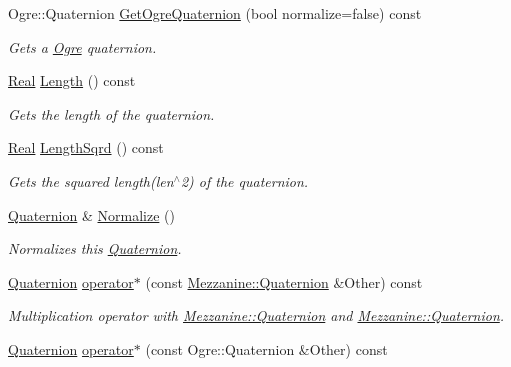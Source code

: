 \begin{DoxyCompactItemize}
Ogre::Quaternion \hyperlink{classMezzanine_1_1Quaternion_a152abb6ccfe1c9dfb22218fd54b84863}{GetOgreQuaternion} (bool normalize=false) const 
\begin{DoxyCompactList}\small\item\em Gets a \hyperlink{namespaceOgre}{Ogre} quaternion. \item\end{DoxyCompactList}\item 
\hyperlink{namespaceMezzanine_a726731b1a7df72bf3583e4a97282c6f6}{Real} \hyperlink{classMezzanine_1_1Quaternion_adb15aea643ea4b9ca1042209ac424fda}{Length} () const 
\begin{DoxyCompactList}\small\item\em Gets the length of the quaternion. \item\end{DoxyCompactList}\item 
\hyperlink{namespaceMezzanine_a726731b1a7df72bf3583e4a97282c6f6}{Real} \hyperlink{classMezzanine_1_1Quaternion_a3086b2ce64af221e8597cb9b0872d054}{LengthSqrd} () const 
\begin{DoxyCompactList}\small\item\em Gets the squared length(len$^\wedge$2) of the quaternion. \item\end{DoxyCompactList}\item 
\hyperlink{classMezzanine_1_1Quaternion}{Quaternion} \& \hyperlink{classMezzanine_1_1Quaternion_a284f73fe1354a2cf632f31ec83ee58ad}{Normalize} ()
\begin{DoxyCompactList}\small\item\em Normalizes this \hyperlink{classMezzanine_1_1Quaternion}{Quaternion}. \item\end{DoxyCompactList}\item 
\hyperlink{classMezzanine_1_1Quaternion}{Quaternion} \hyperlink{classMezzanine_1_1Quaternion_a2b0f4229f959551b88409519aa72af37}{operator$\ast$} (const \hyperlink{classMezzanine_1_1Quaternion}{Mezzanine::Quaternion} \&Other) const 
\begin{DoxyCompactList}\small\item\em Multiplication operator with \hyperlink{classMezzanine_1_1Quaternion}{Mezzanine::Quaternion} and \hyperlink{classMezzanine_1_1Quaternion}{Mezzanine::Quaternion}. \item\end{DoxyCompactList}\item 
\hyperlink{classMezzanine_1_1Quaternion}{Quaternion} \hyperlink{classMezzanine_1_1Quaternion_af93091572666960580ed5c9cd07a1774}{operator$\ast$} (const Ogre::Quaternion \&Other) const 

\end{DoxyCompactItemize}
